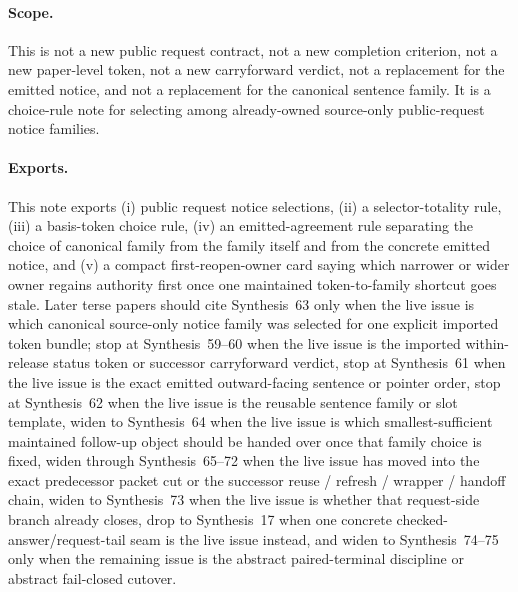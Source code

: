 \documentclass[11pt]{article}
\begin{document}
\paragraph{Scope.}
This is not a new public request contract, not a new completion criterion, not a new paper-level token, not a new carryforward verdict, not a replacement for the emitted notice, and not a replacement for the canonical sentence family.
It is a choice-rule note for selecting among already-owned source-only public-request notice families.

\paragraph{Exports.}
This note exports (i) public request notice selections, (ii) a selector-totality rule, (iii) a basis-token choice rule, (iv) an emitted-agreement rule separating the choice of canonical family from the family itself and from the concrete emitted notice, and (v) a compact first-reopen-owner card saying which narrower or wider owner regains authority first once one maintained token-to-family shortcut goes stale. Later terse papers should cite Synthesis~63 only when the live issue is which canonical source-only notice family was selected for one explicit imported token bundle; stop at Synthesis~59--60 when the live issue is the imported within-release status token or successor carryforward verdict, stop at Synthesis~61 when the live issue is the exact emitted outward-facing sentence or pointer order, stop at Synthesis~62 when the live issue is the reusable sentence family or slot template, widen to Synthesis~64 when the live issue is which smallest-sufficient maintained follow-up object should be handed over once that family choice is fixed, widen through Synthesis~65--72 when the live issue has moved into the exact predecessor packet cut or the successor reuse / refresh / wrapper / handoff chain, widen to Synthesis~73 when the live issue is whether that request-side branch already closes, drop to Synthesis~17 when one concrete checked-answer/request-tail seam is the live issue instead, and widen to Synthesis~74--75 only when the remaining issue is the abstract paired-terminal discipline or abstract fail-closed cutover.\cite{series:publicrequeststatusenvelopes,series:publicrequestcarryforward,series:publicrequestnotices,series:publicrequestnoticenormalforms,series:publicrequestresponsemenus,series:publicrequestresponsepackets,series:publicrequestresponsepacketcarryforward,series:publicrequestresponsepacketdeltaledgers,series:publicrequestresponsepacketrefreshnotices,series:publicrequestresponsepacketrefreshnormalforms,series:publicrequestresponsepacketrefreshselections,series:publicrequestresponsepacketrefreshresponsemenus,series:publicrequestresponsepacketrefreshresponsepackets,series:publicrequestresponsepacketrefreshresponsepacketclosureverdicts,series:pairedterminalcitationdiscipline,series:pairedterminalcutoverrule,series:workedexample}
\end{document}
